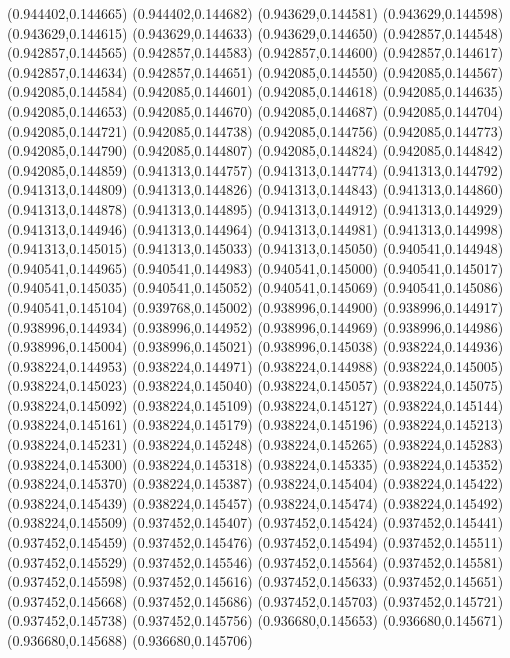 (0.944402,0.144665)
(0.944402,0.144682)
(0.943629,0.144581)
(0.943629,0.144598)
(0.943629,0.144615)
(0.943629,0.144633)
(0.943629,0.144650)
(0.942857,0.144548)
(0.942857,0.144565)
(0.942857,0.144583)
(0.942857,0.144600)
(0.942857,0.144617)
(0.942857,0.144634)
(0.942857,0.144651)
(0.942085,0.144550)
(0.942085,0.144567)
(0.942085,0.144584)
(0.942085,0.144601)
(0.942085,0.144618)
(0.942085,0.144635)
(0.942085,0.144653)
(0.942085,0.144670)
(0.942085,0.144687)
(0.942085,0.144704)
(0.942085,0.144721)
(0.942085,0.144738)
(0.942085,0.144756)
(0.942085,0.144773)
(0.942085,0.144790)
(0.942085,0.144807)
(0.942085,0.144824)
(0.942085,0.144842)
(0.942085,0.144859)
(0.941313,0.144757)
(0.941313,0.144774)
(0.941313,0.144792)
(0.941313,0.144809)
(0.941313,0.144826)
(0.941313,0.144843)
(0.941313,0.144860)
(0.941313,0.144878)
(0.941313,0.144895)
(0.941313,0.144912)
(0.941313,0.144929)
(0.941313,0.144946)
(0.941313,0.144964)
(0.941313,0.144981)
(0.941313,0.144998)
(0.941313,0.145015)
(0.941313,0.145033)
(0.941313,0.145050)
(0.940541,0.144948)
(0.940541,0.144965)
(0.940541,0.144983)
(0.940541,0.145000)
(0.940541,0.145017)
(0.940541,0.145035)
(0.940541,0.145052)
(0.940541,0.145069)
(0.940541,0.145086)
(0.940541,0.145104)
(0.939768,0.145002)
(0.938996,0.144900)
(0.938996,0.144917)
(0.938996,0.144934)
(0.938996,0.144952)
(0.938996,0.144969)
(0.938996,0.144986)
(0.938996,0.145004)
(0.938996,0.145021)
(0.938996,0.145038)
(0.938224,0.144936)
(0.938224,0.144953)
(0.938224,0.144971)
(0.938224,0.144988)
(0.938224,0.145005)
(0.938224,0.145023)
(0.938224,0.145040)
(0.938224,0.145057)
(0.938224,0.145075)
(0.938224,0.145092)
(0.938224,0.145109)
(0.938224,0.145127)
(0.938224,0.145144)
(0.938224,0.145161)
(0.938224,0.145179)
(0.938224,0.145196)
(0.938224,0.145213)
(0.938224,0.145231)
(0.938224,0.145248)
(0.938224,0.145265)
(0.938224,0.145283)
(0.938224,0.145300)
(0.938224,0.145318)
(0.938224,0.145335)
(0.938224,0.145352)
(0.938224,0.145370)
(0.938224,0.145387)
(0.938224,0.145404)
(0.938224,0.145422)
(0.938224,0.145439)
(0.938224,0.145457)
(0.938224,0.145474)
(0.938224,0.145492)
(0.938224,0.145509)
(0.937452,0.145407)
(0.937452,0.145424)
(0.937452,0.145441)
(0.937452,0.145459)
(0.937452,0.145476)
(0.937452,0.145494)
(0.937452,0.145511)
(0.937452,0.145529)
(0.937452,0.145546)
(0.937452,0.145564)
(0.937452,0.145581)
(0.937452,0.145598)
(0.937452,0.145616)
(0.937452,0.145633)
(0.937452,0.145651)
(0.937452,0.145668)
(0.937452,0.145686)
(0.937452,0.145703)
(0.937452,0.145721)
(0.937452,0.145738)
(0.937452,0.145756)
(0.936680,0.145653)
(0.936680,0.145671)
(0.936680,0.145688)
(0.936680,0.145706)
